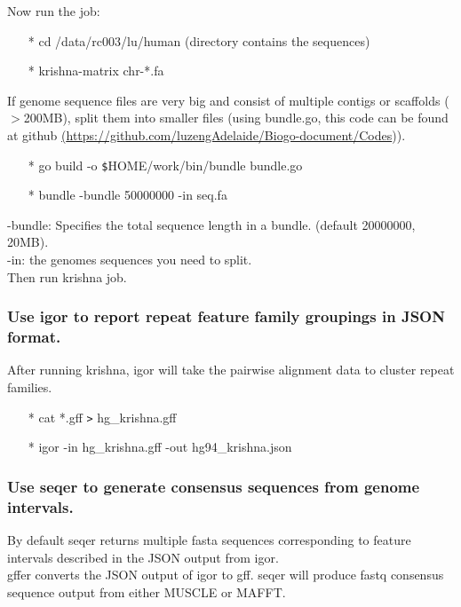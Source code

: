\documentclass[12pt]{report}
\begin{document}
\noindent Now run the job:

\begin{enumerate}
	\item[*] cd /data/rc003/lu/human (directory contains the sequences)
	\item[*] krishna-matrix chr-*.fa
\end{enumerate}

\noindent If genome sequence files are very big and consist of multiple contigs or scaffolds ($>$200MB), split them into smaller files (using bundle.go, this code can be found at github \href{<url>}(\url{https://github.com/luzengAdelaide/Biogo-document/Codes})).\\

\begin{enumerate}
	\item[*] go build -o \texttt{\$}HOME/work/bin/bundle bundle.go
	\item[*] bundle -bundle 50000000 -in seq.fa
\end{enumerate}

\noindent -bundle: Specifies the total sequence length in a bundle. (default 20000000, 20MB).\\
-in: the genomes sequences you need to split.\\
Then run krishna job.\\

\subsubsection*{Use igor to report repeat feature family groupings in JSON format.}

After running krishna, igor will take the pairwise alignment data to cluster repeat families.
\begin{enumerate}
	\item[*] cat *.gff \texttt{>} hg\_krishna.gff
	\item[*] igor -in hg\_krishna.gff -out hg94\_krishna.json
\end{enumerate}

\subsubsection*{Use seqer to generate consensus sequences from genome intervals.}
By default seqer returns multiple fasta sequences corresponding to feature intervals described in the JSON output from igor. \\

gffer converts the JSON output of igor to gff. seqer will produce fastq consensus sequence output from either MUSCLE or MAFFT. 
\end{document}
